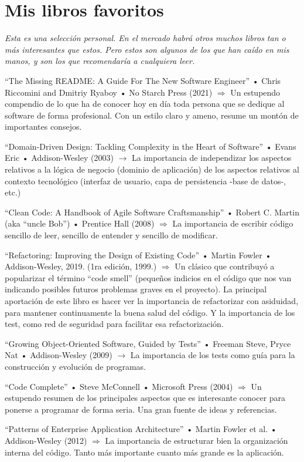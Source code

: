 \documentclass[spanish,12pt,a4paper,final,oneside]{book}
\begin{document}
\section{Mis libros favoritos}
\textit{Esta es una selección personal. En el mercado habrá otros muchos libros tan o más interesantes que estos. Pero estos son algunos de los que han caído en mis manos, y son los que recomendaría a cualquiera leer.}

``The Missing README: A Guide For The New Software Engineer'' • Chris Riccomini and Dmitriy Ryaboy • No Starch Press (2021) $\Rightarrow$ Un estupendo compendio de lo que ha de conocer hoy en día toda persona que se dedique al software de forma profesional. Con un estilo claro y ameno, resume un montón de importantes consejos.

``Domain-Driven Design: Tackling Complexity in the Heart of Software'' • Evans Eric • Addison-Wesley (2003) $\rightarrow$ La importancia de independizar los aspectos relativos a la lógica de negocio (dominio de aplicación) de los aspectos relativos al contexto tecnológico (interfaz de usuario, capa de persistencia -base de datos-, etc.) 

``Clean Code: A Handbook of Agile Software Craftsmanship'' • Robert C. Martin (aka ``uncle Bob'') • Prentice Hall (2008) $\Rightarrow$ La importancia de escribir código sencillo de leer, sencillo de entender y sencillo de modificar.

``Refactoring: Improving the Design of Existing Code'' • Martin Fowler • Addison-Wesley, 2019. (1ra edición, 1999.) $\Rightarrow$ Un clásico que contribuyó a popularizar el término ``code smell'' (pequeños indicios en el código que nos van indicando posibles futuros problemas graves en el proyecto). La principal aportación de este libro es hacer ver la importancia de refactorizar con asiduidad, para mantener continuamente la buena salud del código. Y la importancia de los test, como red de seguridad para facilitar esa refactorización.

``Growing Object-Oriented Software, Guided by Tests'' • Freeman Steve, Pryce Nat • Addison-Wesley (2009) $\rightarrow$ La importancia de los tests como guía para la construcción y evolución de programas.

``Code Complete'' • Steve McConnell • Microsoft Press (2004) $\Rightarrow$ Un estupendo resumen de los principales aspectos que es interesante conocer para ponerse a programar de forma seria. Una gran fuente de ideas y referencias.

``Patterns of Enterprise Application Architecture'' • Martin Fowler et al. • Addison-Wesley (2012) $\Rightarrow$ La importancia de estructurar bien la organización interna del código. Tanto más importante cuanto más grande es la aplicación.                        
\end{document}
